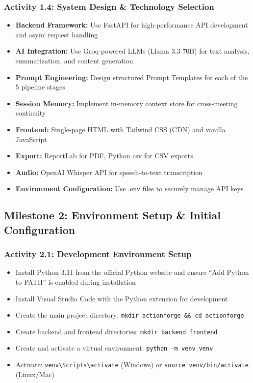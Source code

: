 \documentclass[12pt,a4paper]{article}
\begin{document}
\subsubsection{Activity 1.4: System Design \& Technology Selection}
\begin{itemize}
  \item \textbf{Backend Framework:} Use FastAPI for high-performance API development and async request handling
  \item \textbf{AI Integration:} Use Groq-powered LLMs (Llama 3.3 70B) for text analysis, summarization, and content generation
  \item \textbf{Prompt Engineering:} Design structured Prompt Templates for each of the 5 pipeline stages
  \item \textbf{Session Memory:} Implement in-memory context store for cross-meeting continuity
  \item \textbf{Frontend:} Single-page HTML with Tailwind CSS (CDN) and vanilla JavaScript
  \item \textbf{Export:} ReportLab for PDF, Python csv for CSV exports
  \item \textbf{Audio:} OpenAI Whisper API for speech-to-text transcription
  \item \textbf{Environment Configuration:} Use .env files to securely manage API keys
\end{itemize}

\subsection{Milestone 2: Environment Setup \& Initial Configuration}

\subsubsection{Activity 2.1: Development Environment Setup}
\begin{itemize}
  \item Install Python 3.11 from the official Python website and ensure ``Add Python to PATH'' is enabled during installation
  \item Install Visual Studio Code with the Python extension for development
  \item Create the main project directory: \texttt{mkdir actionforge \&\& cd actionforge}
  \item Create backend and frontend directories: \texttt{mkdir backend frontend}
  \item Create and activate a virtual environment: \texttt{python -m venv venv}
  \item Activate: \texttt{venv\textbackslash Scripts\textbackslash activate} (Windows) or \texttt{source venv/bin/activate} (Linux/Mac)
\end{itemize}
\end{document}
